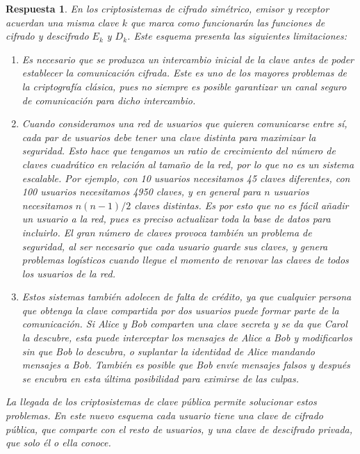 \documentclass[
  a4paper,
  spanish,
  12pt,
]{scrartcl}
\theoremstyle{ejercicio-style}
\theoremstyle{remark-style}
\newtheorem*{sol}{Respuesta}
\theoremstyle{teorema-style}
\begin{document}
\begin{sol}
  En los criptosistemas de cifrado simétrico, emisor y receptor acuerdan una misma clave $k$ que marca como funcionarán las funciones de cifrado y descifrado $E_k$ y $D_k$. Este esquema presenta las siguientes limitaciones:

\begin{enumerate}
\item Es necesario que se produzca un intercambio inicial de la clave antes de poder establecer la comunicación cifrada. Este es uno de los mayores problemas de la criptografía clásica, pues no siempre es posible garantizar un canal seguro de comunicación para dicho intercambio.

\item Cuando consideramos una red de usuarios que quieren comunicarse entre sí, cada par de usuarios debe tener una clave distinta para maximizar la seguridad. Esto hace que tengamos un ratio de crecimiento del número de claves cuadrático en relación al tamaño de la red, por lo que no es un sistema escalable. Por ejemplo, con 10 usuarios necesitamos 45 claves diferentes, con 100 usuarios necesitamos 4950 claves, y en general para $n$ usuarios necesitamos $n(n-1)/2$ claves distintas.
Es por esto que no es fácil añadir un usuario a la red, pues es preciso actualizar toda la base de datos para incluirlo. El gran número de claves provoca también un problema de seguridad, al ser necesario que cada usuario guarde sus claves, y genera problemas logísticos cuando llegue el momento de renovar las claves de todos los usuarios de la red.

\item Estos sistemas también adolecen de falta de crédito, ya que cualquier persona que obtenga la clave compartida por dos usuarios puede formar parte de la comunicación. Si Alice y Bob comparten una clave secreta y se da que Carol la descubre, esta puede interceptar los mensajes de Alice a Bob y modificarlos sin que Bob lo descubra, o suplantar la identidad de Alice mandando mensajes a Bob. También es posible que Bob envíe mensajes falsos y después se encubra en esta última posibilidad para eximirse de las culpas.
\end{enumerate}

La llegada de los criptosistemas de clave pública permite solucionar estos problemas. En este nuevo esquema cada usuario tiene una clave de cifrado pública, que comparte con el resto de usuarios, y una clave de descifrado privada, que solo él o ella conoce.


\end{sol}
\end{document}
